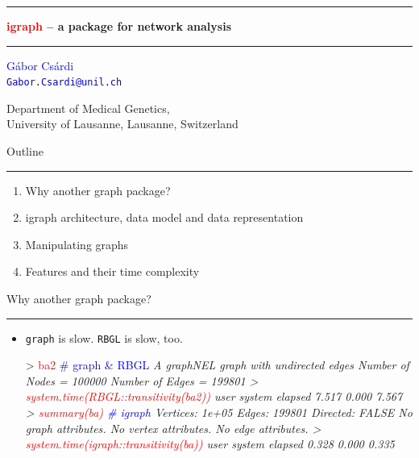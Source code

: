 \documentclass[landscape]{foils}
\newcommand{\stitle}[1]{{\centering\color{blue}\Large #1\par\vspace*{10pt}\hrule}}
\newcommand{\command}[1]{\textcolor{red}{#1}}
\newcommand{\comment}[1]{\textcolor{blue}{#1}}
\begin{document}
\RaggedRight


\thispagestyle{empty}
\vspace*{1cm}
{\centering
\hrule
\Large
\vspace*{1cm}
{\bf \textcolor{red}{igraph} -- a package for network analysis}
\vspace*{1cm}
\par
\hrule
\par
\vspace*{4cm}
\normalsize\textcolor{blue}{G\'abor Cs\'ardi}\\
\small \textcolor{blue}{\texttt{Gabor.Csardi@unil.ch}}
\par
\vspace*{1.5cm}
Department of Medical Genetics, \\
University of Lausanne, Lausanne, Switzerland\\
}

\newpage

\stitle{Outline}

\begin{enumerate}
\centering\Large
\vfill
\item Why another graph package?\\
\vfill
\item igraph architecture, data model and data representation\\
\vfill
\item Manipulating graphs\\
\vfill
\item Features and their time complexity\\
\vfill
\mbox{}
\vfill
\end{enumerate}

\newpage
\stitle{Why another graph package?}
\begin{itemize}
\item \texttt{graph} is slow. \texttt{RBGL} is slow, too.
\marginpar{\vspace*{3.5cm}}
\begin{Myverb}
> \command{ba2}\comment{                                # graph \& RBGL}
\slshape A graphNEL graph with undirected edges
\slshape Number of Nodes = 100000 
\slshape Number of Edges = 199801  \pause
> \command{system.time(RBGL::transitivity(ba2))}
\slshape    user  system elapsed 
\slshape   7.517   0.000   7.567 \pause
> \command{summary(ba)}\comment{                        # igraph}
\slshape Vertices: 1e+05 
\slshape Edges: 199801 
\slshape Directed: FALSE 
\slshape No graph attributes.
\slshape No vertex attributes.
\slshape No edge attributes. \pause
> \command{system.time(igraph::transitivity(ba))}
\slshape    user  system elapsed 
\slshape   0.328   0.000   0.335 
\end{Myverb}
\end{itemize}
\end{document}
